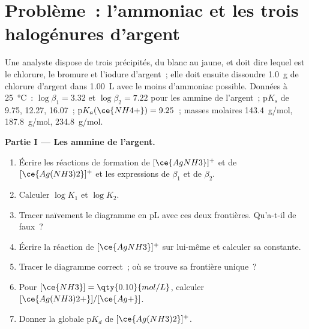 \section{Problème~: l'ammoniac et les trois halogénures d'argent}

\begin{problem}
\label{pb:b1:complexation:1}
Une analyste dispose de trois précipités, du blanc au jaune, et doit
dire lequel est le chlorure, le bromure et l'iodure d'argent~; elle doit
ensuite dissoudre \qty{1.0}{g} de chlorure d'argent dans
\qty{1.00}{L} avec le moins d'ammoniac possible. Données à
\qty{25}{\celsius}~: $\log\beta_1 = 3.32$ et
$\log\beta_2 = 7.22$ pour les  ammine de l'argent~;
$\mathrm{p}K_s$ de 
9.75,  12.27,  16.07~; $\mathrm{p}K_a(\ce{NH4+}) = 9.25$~;
masses molaires  \qty{143.4}{g/mol},  \qty{187.8}{g/mol},
 \qty{234.8}{g/mol}.

\medskip
\noindent\textbf{Partie I --- Les  ammine de l'argent.}
\begin{enumerate}
  \item Écrire les réactions de formation de $[\ce{AgNH3}]^{+}$ et de
        $[\ce{Ag(NH3)2}]^{+}$ et les expressions de $\beta_1$ et de
        $\beta_2$.
  \item Calculer $\log K_1$ et $\log K_2$.
  \item Tracer naïvement le diagramme en pL avec ces deux frontières.
        Qu'a-t-il de faux~?
  \item Écrire la réaction de $[\ce{AgNH3}]^{+}$ sur lui-même et calculer
        sa constante.
  \item Tracer le diagramme correct~; où se trouve sa frontière unique~?
  \item Pour $[\ce{NH3}] = \qty{0.10}{mol/L}$, calculer
        $[\ce{Ag(NH3)2+}]/[\ce{Ag+}]$.
  \item Donner la  globale $\mathrm{p}K_d$ de
        $[\ce{Ag(NH3)2}]^{+}$.
\end{enumerate}


\end{problem}
